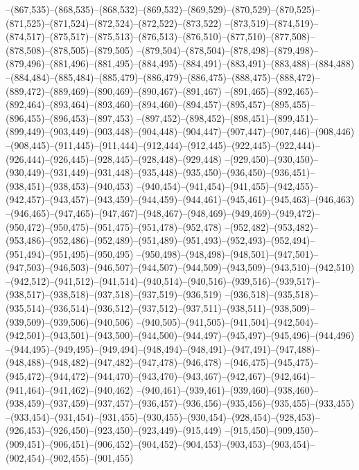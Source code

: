 --(867,535)--(868,535)--(868,532)--(869,532)--(869,529)--(870,529)--(870,525)--(871,525)--(871,524)--(872,524)--(872,522)--(873,522)
--(873,519)--(874,519)--(874,517)--(875,517)--(875,513)--(876,513)--(876,510)--(877,510)--(877,508)--(878,508)--(878,505)--(879,505)
--(879,504)--(878,504)--(878,498)--(879,498)--(879,496)--(881,496)--(881,495)--(884,495)--(884,491)--(883,491)--(883,488)--(884,488)
--(884,484)--(885,484)--(885,479)--(886,479)--(886,475)--(888,475)--(888,472)--(889,472)--(889,469)--(890,469)--(890,467)--(891,467)
--(891,465)--(892,465)--(892,464)--(893,464)--(893,460)--(894,460)--(894,457)--(895,457)--(895,455)--(896,455)--(896,453)--(897,453)
--(897,452)--(898,452)--(898,451)--(899,451)--(899,449)--(903,449)--(903,448)--(904,448)--(904,447)--(907,447)--(907,446)--(908,446)
--(908,445)--(911,445)--(911,444)--(912,444)--(912,445)--(922,445)--(922,444)--(926,444)--(926,445)--(928,445)--(928,448)--(929,448)
--(929,450)--(930,450)--(930,449)--(931,449)--(931,448)--(935,448)--(935,450)--(936,450)--(936,451)--(938,451)--(938,453)--(940,453)
--(940,454)--(941,454)--(941,455)--(942,455)--(942,457)--(943,457)--(943,459)--(944,459)--(944,461)--(945,461)--(945,463)--(946,463)
--(946,465)--(947,465)--(947,467)--(948,467)--(948,469)--(949,469)--(949,472)--(950,472)--(950,475)--(951,475)--(951,478)--(952,478)
--(952,482)--(953,482)--(953,486)--(952,486)--(952,489)--(951,489)--(951,493)--(952,493)--(952,494)--(951,494)--(951,495)--(950,495)
--(950,498)--(948,498)--(948,501)--(947,501)--(947,503)--(946,503)--(946,507)--(944,507)--(944,509)--(943,509)--(943,510)--(942,510)
--(942,512)--(941,512)--(941,514)--(940,514)--(940,516)--(939,516)--(939,517)--(938,517)--(938,518)--(937,518)--(937,519)--(936,519)
--(936,518)--(935,518)--(935,514)--(936,514)--(936,512)--(937,512)--(937,511)--(938,511)--(938,509)--(939,509)--(939,506)--(940,506)
--(940,505)--(941,505)--(941,504)--(942,504)--(942,501)--(943,501)--(943,500)--(944,500)--(944,497)--(945,497)--(945,496)--(944,496)
--(944,495)--(949,495)--(949,494)--(948,494)--(948,491)--(947,491)--(947,488)--(948,488)--(948,482)--(947,482)--(947,478)--(946,478)
--(946,475)--(945,475)--(945,472)--(944,472)--(944,470)--(943,470)--(943,467)--(942,467)--(942,464)--(941,464)--(941,462)--(940,462)
--(940,461)--(939,461)--(939,460)--(938,460)--(938,459)--(937,459)--(937,457)--(936,457)--(936,456)--(935,456)--(935,455)--(933,455)
--(933,454)--(931,454)--(931,455)--(930,455)--(930,454)--(928,454)--(928,453)--(926,453)--(926,450)--(923,450)--(923,449)--(915,449)
--(915,450)--(909,450)--(909,451)--(906,451)--(906,452)--(904,452)--(904,453)--(903,453)--(903,454)--(902,454)--(902,455)--(901,455)
